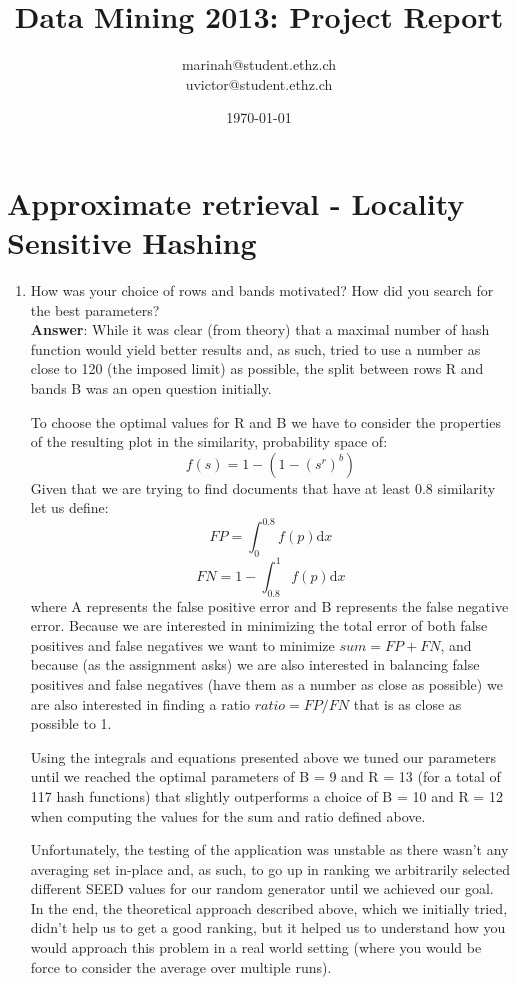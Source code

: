 \documentclass[11pt]{article}
\title{Data Mining 2013: Project Report}
\author{marinah@student.ethz.ch\\ uvictor@student.ethz.ch\\}
\date{\today}
\begin{document}
\maketitle

\section{Approximate retrieval - Locality Sensitive Hashing}
\begin{enumerate}
\item How was your choice of rows and bands motivated? How did you search for
the best parameters? \\
\textbf{Answer}:
While it was clear (from theory) that a maximal number of hash function would
yield better results and, as such, tried to use a number as close to 120 (the
imposed limit) as possible, the split between rows R and bands B was an open
question initially.

To choose the optimal values for R and B we have to consider the properties of
the resulting plot in the similarity, probability space of:
$$ f(s) = 1 - (1 - (s^r)^b) $$
Given that we are trying to find documents that have at least 0.8 similarity let us define:
$$ FP = \int_0^{0.8} f(p) \mathrm{d}x $$
$$ FN = 1 - \int_{0.8}^1 f(p) \mathrm{d}x $$
where A represents the false positive error and B represents the false negative
error.  Because we are interested in minimizing the total error of both false
positives and false negatives we want to minimize $sum = FP + FN$, and because
(as the assignment asks) we are also interested in balancing false positives
and false negatives (have them as a number as close as possible) we are also
interested in finding a ratio $ratio = FP / FN$ that is as close as possible to 1.

Using the integrals and equations presented above we tuned our parameters until
we reached the optimal parameters of B = 9 and R = 13 (for a total of 117 hash
functions) that slightly outperforms a choice of B = 10 and R = 12 when
computing the values for the sum and ratio defined above.

Unfortunately, the testing of the application was unstable as there wasn't any
averaging set in-place and, as such, to go up in ranking we arbitrarily
selected different SEED values for our random generator until we achieved our
goal. In the end, the theoretical approach described above, which we initially
tried, didn't help us to get a good ranking, but it helped us to understand how
you would approach this problem in a real world setting (where you would be
force to consider the average over multiple runs).


\end{enumerate}
\end{document}
